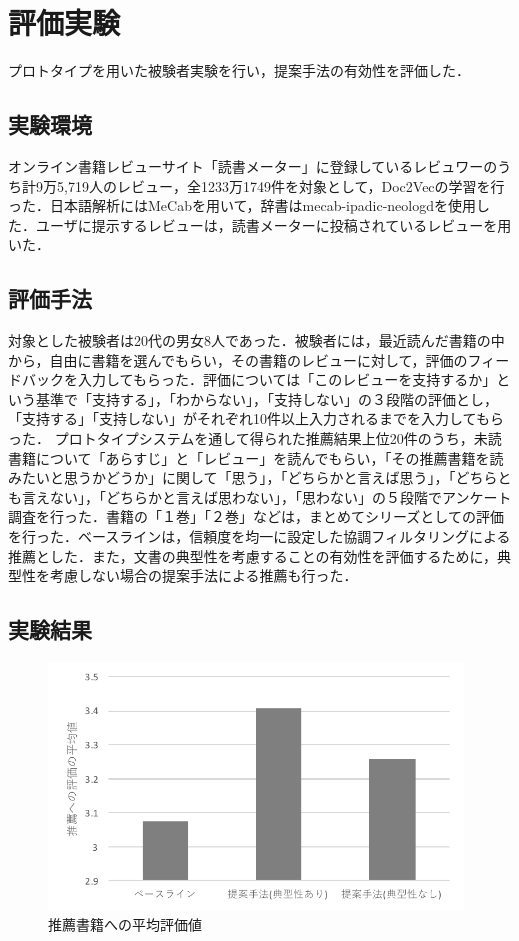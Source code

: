 \documentclass[a4paper,11pt,oneside,openany]{jsbook}
\begin{document}
	\section{評価実験}
プロトタイプを用いた被験者実験を行い，提案手法の有効性を評価した．
		\subsection{実験環境}
オンライン書籍レビューサイト「読書メーター」\cite{bookmeter}に登録しているレビュワーのうち計9万5,719人のレビュー，全1233万1749件を対象として，Doc2Vecの学習を行った．日本語解析にはMeCabを用いて，辞書はmecab-ipadic-neologd\cite{mecabdic}を使用した．ユーザに提示するレビューは，読書メーターに投稿されているレビューを用いた．

		\subsection{評価手法}
対象とした被験者は20代の男女8人であった．被験者には，最近読んだ書籍の中から，自由に書籍を選んでもらい，その書籍のレビューに対して，評価のフィードバックを入力してもらった．評価については「このレビューを支持するか」という基準で「支持する」，「わからない」，「支持しない」の３段階の評価とし，「支持する」「支持しない」がそれぞれ10件以上入力されるまでを入力してもらった．
プロトタイプシステムを通して得られた推薦結果上位20件のうち，未読書籍について「あらすじ」と「レビュー」を読んでもらい，「その推薦書籍を読みたいと思うかどうか」に関して「思う」，「どちらかと言えば思う」，「どちらとも言えない」，「どちらかと言えば思わない」，「思わない」の５段階でアンケート調査を行った．書籍の「１巻」「２巻」などは，まとめてシリーズとしての評価を行った．ベースラインは，信頼度を均一に設定した協調フィルタリングによる推薦とした．また，文書の典型性を考慮することの有効性を評価するために，典型性を考慮しない場合の提案手法による推薦も行った．
		\subsection{実験結果}
\begin{figure}[tb]
	\begin{center} %
		\includegraphics [width = 110mm] {figures/result2.pdf} %
	\end{center}
	\caption{推薦書籍への平均評価値} %
	\label{fig:result1} %
\end{figure}
\end{document}
